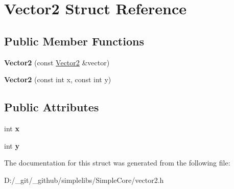 \hypertarget{struct_vector2}{}\section{Vector2 Struct Reference}
\label{struct_vector2}
\subsection*{Public Member Functions}
\begin{DoxyCompactItemize}
\item 
\mbox{\label{struct_vector2_a1f8048ff55f6774268e6d2c0ccfc1c1f}} 
{\bfseries Vector2} (const \mbox{\hyperlink{struct_vector2}{Vector2}} \&vector)
\item 
\mbox{\label{struct_vector2_ab8f45fecaaf212103ef852f58acef81a}} 
{\bfseries Vector2} (const int x, const int y)
\end{DoxyCompactItemize}
\subsection*{Public Attributes}
\begin{DoxyCompactItemize}
\item 
\mbox{\label{struct_vector2_a13cc252330d618e32ef0fc063d2c7a08}} 
int {\bfseries x}
\item 
\mbox{\label{struct_vector2_a0ac4e1861754c11801150e0bbb2d0866}} 
int {\bfseries y}
\end{DoxyCompactItemize}


The documentation for this struct was generated from the following file\+:\begin{DoxyCompactItemize}
\item 
D\+:/\+\_\+git/\+\_\+github/simplelibs/\+Simple\+Core/vector2.\+h\end{DoxyCompactItemize}
